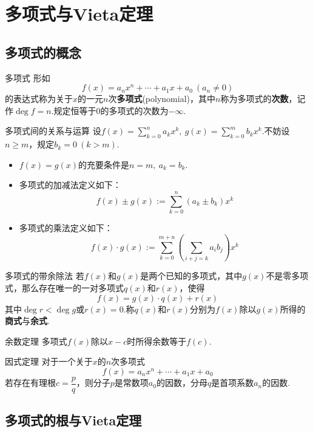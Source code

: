 \documentclass[lang=cn, zihao=5]{elegantbook}
\newcommand{\ssb}[1]{\left( #1 \right)}
\begin{document}
\section{多项式与Vieta定理}

\subsection{多项式的概念}

\begin{definition}{多项式}
	形如$$f(x) = a_nx^n + \cdots + a_1x + a_0~(a_n \neq 0)$$的表达式称为关于$x$的一元$n$次\textbf{多项式}(polynomial)，其中$n$称为多项式的\textbf{次数}，记作$\deg f = n$.规定恒等于$0$的多项式的次数为$-\infty$.
\end{definition}

\begin{definition}{多项式间的关系与运算}
	设$f(x) = \sum_{k=0}^{n}a_kx^k,~g(x) = \sum_{k=0}^{m}b_kx^k$.不妨设$n \geq m$，规定$b_k=0~(k > m)$.
	\begin{itemize}
		\item $f(x)=g(x)$的充要条件是$n=m,~a_k=b_k$.
		\item 多项式的加减法定义如下：$$f(x) \pm g(x) := \sum_{k=0}^{n} (a_k \pm b_k)x^{k}$$
		\item 多项式的乘法定义如下：$$f(x) \cdot g(x) := \sum_{k=0}^{m+n} \ssb{\sum_{i+j=k}a_ib_j}x^k$$
	\end{itemize}
\end{definition}

\begin{proposition}{多项式的带余除法}
	若$f(x)$和$g(x)$是两个已知的多项式，其中$g(x)$不是零多项式，那么存在唯一的一对多项式$q(x)$和$r(x)$，使得$$f(x) = g(x) \cdot q(x) + r(x)$$其中$\deg r < \deg g$或$r(x)=0$.称$q(x)$和$r(x)$分别为$f(x)$除以$g(x)$所得的\textbf{商式}与\textbf{余式}.
\end{proposition}

\begin{theorem}{余数定理}
	多项式$f(x)$除以$x-c$时所得余数等于$f(c)$.
\end{theorem}

\begin{theorem}{因式定理}
    对于一个关于$x$的$n$次多项式$$f(x)=a_nx^n+ \cdots +a_1x+a_0$$若存在有理根$c=\dfrac{p}{q}$，则分子$p$是常数项$a_0$的因数，分母$q$是首项系数$a_n$的因数.
\end{theorem}

\subsection{多项式的根与Vieta定理}
\end{document}
